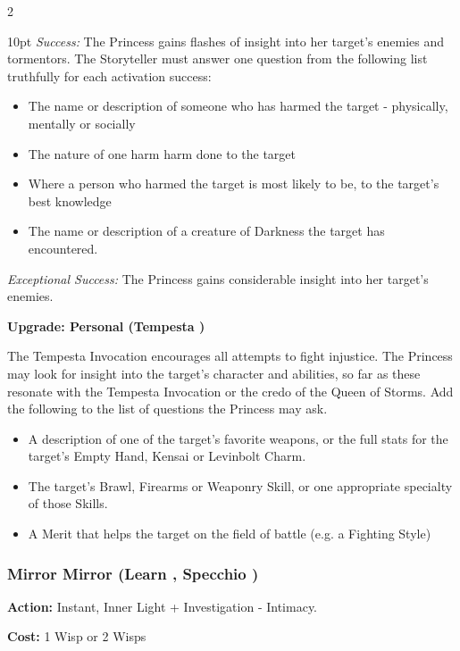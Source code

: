 \begin{multicols}{2}
\begin{myindentpar}{10pt}
\emph{Success:} The Princess gains flashes of insight into her target's enemies and tormentors. The Storyteller must answer one question from the following list truthfully for each activation success:

\begin{itemize}
\item The name or description of someone who has harmed the target - physically, mentally or socially
\item The nature of one harm harm done to the target
\item Where a person who harmed the target is most likely to be, to the target's best knowledge
\item The name or description of a creature of Darkness the target has encountered.
\end{itemize}

\emph{Exceptional Success:} The Princess gains considerable insight into her target's enemies.

\textbf{Upgrade: Personal (Tempesta \textbullet\textbullet)}

The Tempesta Invocation encourages all attempts to fight injustice. The Princess may look for insight into the target's character and abilities, so far as these resonate with the Tempesta Invocation or the credo of the Queen of Storms. Add the following to the list of questions the Princess may ask.
\begin{itemize}
\item A description of one of the target's favorite weapons, or the full stats for the target's Empty Hand, Kensai or Levinbolt Charm. 
\item The target's Brawl, Firearms or Weaponry Skill, or one appropriate specialty of those Skills. 
\item A Merit that helps the target on the field of battle (e.g. a Fighting Style)\end{itemize}
\end{myindentpar}
                                         

\subsubsection*{Mirror Mirror (Learn \textbullet\textbullet, Specchio \textbullet\textbullet)}

\noindent \textbf{Action:} Instant, Inner Light + Investigation - Intimacy.

\noindent \textbf{Cost:} 1 Wisp or 2 Wisps


\end{multicols}
